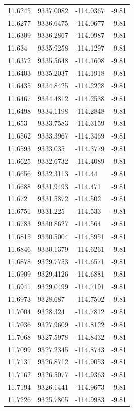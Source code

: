 \begin{table}[H]
\begin{tabular}{llll}
11.6245 & 9337.0082 & -114.0367 & -9.81 \\
11.6277 & 9336.6475 & -114.0677 & -9.81 \\
11.6309 & 9336.2867 & -114.0987 & -9.81 \\
11.634 & 9335.9258 & -114.1297 & -9.81 \\
11.6372 & 9335.5648 & -114.1608 & -9.81 \\
11.6403 & 9335.2037 & -114.1918 & -9.81 \\
11.6435 & 9334.8425 & -114.2228 & -9.81 \\
11.6467 & 9334.4812 & -114.2538 & -9.81 \\
11.6498 & 9334.1198 & -114.2848 & -9.81 \\
11.653 & 9333.7583 & -114.3159 & -9.81 \\
11.6562 & 9333.3967 & -114.3469 & -9.81 \\
11.6593 & 9333.035 & -114.3779 & -9.81 \\
11.6625 & 9332.6732 & -114.4089 & -9.81 \\
11.6656 & 9332.3113 & -114.44 & -9.81 \\
11.6688 & 9331.9493 & -114.471 & -9.81 \\
11.672 & 9331.5872 & -114.502 & -9.81 \\
11.6751 & 9331.225 & -114.533 & -9.81 \\
11.6783 & 9330.8627 & -114.564 & -9.81 \\
11.6815 & 9330.5004 & -114.5951 & -9.81 \\
11.6846 & 9330.1379 & -114.6261 & -9.81 \\
11.6878 & 9329.7753 & -114.6571 & -9.81 \\
11.6909 & 9329.4126 & -114.6881 & -9.81 \\
11.6941 & 9329.0499 & -114.7191 & -9.81 \\
11.6973 & 9328.687 & -114.7502 & -9.81 \\
11.7004 & 9328.324 & -114.7812 & -9.81 \\
11.7036 & 9327.9609 & -114.8122 & -9.81 \\
11.7068 & 9327.5978 & -114.8432 & -9.81 \\
11.7099 & 9327.2345 & -114.8743 & -9.81 \\
11.7131 & 9326.8712 & -114.9053 & -9.81 \\
11.7162 & 9326.5077 & -114.9363 & -9.81 \\
11.7194 & 9326.1441 & -114.9673 & -9.81 \\
11.7226 & 9325.7805 & -114.9983 & -9.81 \\

\end{tabular}
\end{table}
